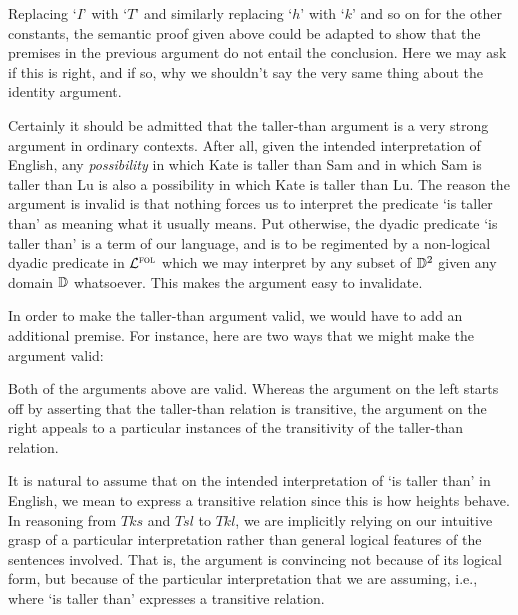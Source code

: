 Replacing `$I$' with `$T$' and similarly replacing `$h$' with `$k$' and so on for the other constants, the semantic proof given above could be adapted to show that the premises in the previous argument do not entail the conclusion.
Here we may ask if this is right, and if so, why we shouldn't say the very same thing about the identity argument.

Certainly it should be admitted that the taller-than argument is a very strong argument in ordinary contexts.
After all, given the intended interpretation of English, any \textit{possibility} in which Kate is taller than Sam and in which Sam is taller than Lu is also a possibility in which Kate is taller than Lu. 
The reason the argument is invalid is that nothing forces us to interpret the predicate `is taller than' as meaning what it usually means.
Put otherwise, the dyadic predicate `is taller than' is a  term of our language, and is to be regimented by a non-logical dyadic predicate in $\mathcal{L}^{\textsc{fol}}$ which we may interpret by any subset of $\mathbb{D}^2$ given any domain $\mathbb{D}$ whatsoever. 
This makes the argument easy to invalidate.

In order to make the taller-than argument valid, we would have to add an additional premise.
For instance, here are two ways that we might make the argument valid:

\begin{multicols}{2}
  \begin{earg}
  \end{earg}

  \begin{earg}
  \end{earg}
\end{multicols}

Both of the arguments above are valid.
Whereas the argument on the left starts off by asserting that the taller-than relation is transitive, the argument on the right appeals to a particular instances of the transitivity of the taller-than relation.

It is natural to assume that on the intended interpretation of `is taller than' in English, we mean to express a transitive relation since this is how heights behave.
In reasoning from $Tks$ and $Tsl$ to $Tkl$, we are implicitly relying on our intuitive grasp of a particular interpretation rather than general logical features of the sentences involved. 
That is, the argument is convincing not because of its logical form, but because of the particular interpretation that we are assuming, i.e., where `is taller than' expresses a transitive relation.

